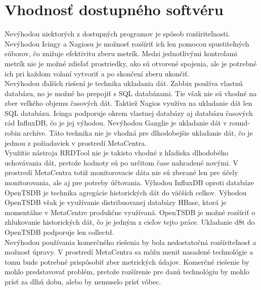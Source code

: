 \documentclass[printed,11pt,twoside,color,cover,table]{fithesis3}
\begin{document}
\section{Vhodnosť dostupného softvéru}
Nevýhodou niektorých z dostupných programov je spôsob rozšíriteľnosti. Nevýhodou Icingy a Nagiosu je možnosť rozšíriť ich len pomocou spustiteľných súborov, čo znižuje efektivitu zberu metrík.
Medzi jednotlivými kontrolami metrík nie je možné zdieľať prostriedky, ako sú otvorené spojenia, ale je potrebné ich pri každom volaní vytvoriť a po skončení zberu ukončiť.
\\Nevýhodou ďalších riešení je technika ukladania dát. Zabbix používa vlastnú databázu, no je možné ho prepojiť s SQL databázami. Tie však nie sú vhodné na zber veľkého objemu časových dát. Taktiež Nagios
využíva na ukladanie dát len SQL databázu. Icinga podporuje okrem vlastnej databázy aj databázu časových rád InfluxDB, čo je jej výhodou. Nevýhodou Ganglie je ukladanie dát v round-robin archíve. Táto technika
nie je vhodná pre dlhodobejšie ukladanie dát, čo je jednou z požiadaviek v prostredí MetaCentra.
\\Využitie nástroja RRDTool nie je takisto vhodné z hľadiska dlhodobého uchovávania dát, pretože hodnoty sú po určitom čase nahradené novými. V prostredí MetaCentra totiž monitorovacie dáta nie sú zberané len 
pre účely monitorovania, ale aj pre potreby účtovania. Výhodou InfluxDB oproti databáze OpenTSDB je technika agregácie historických dát do väčších celkov. Výhodou OpenTSDB však je využívanie distribuovanej
databázy HBase, ktorá je momentálne v MetaCentre produkčne využívaná. OpenTSDB je možné rozšíriť o zhlukovanie historických dát, čo je jedným z cieľov tejto práce. Ukladanie d8t do OpenTSDB podporuje len collectd.
\\Nevýhodou používania komerčného riešenia by bola nedostatočná rozšíriteľnosť a možnosť úpravy. V prostredí MetaCentra sa môžu meniť nasadené technológie a tomu bude potrebné prispôsobiť zber 
metrických údajov. Komerčné riešenie by mohlo predstavovať problém, pretože rozšírenie pre danú technológiu by mohlo prísť za dlhú dobu, alebo by nemuselo prísť vôbec.
\end{document}
